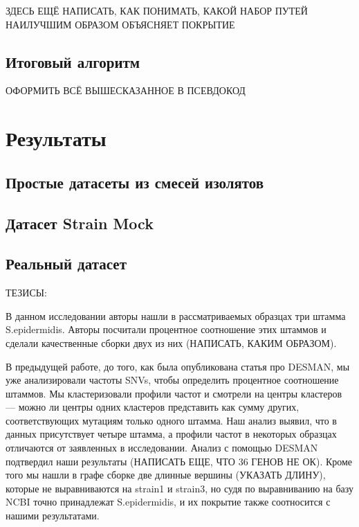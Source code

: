 \documentclass{spbau-diploma}
\begin{document}
ЗДЕСЬ ЕЩЁ НАПИСАТЬ, КАК ПОНИМАТЬ, КАКОЙ НАБОР ПУТЕЙ НАИЛУЧШИМ ОБРАЗОМ ОБЪЯСНЯЕТ ПОКРЫТИЕ

\subsection{Итоговый алгоритм}

ОФОРМИТЬ ВСЁ ВЫШЕСКАЗАННОЕ В ПСЕВДОКОД



\section{Результаты}
\subsection{Простые датасеты из смесей изолятов}
\subsection{Датасет Strain Mock}
\subsection{Реальный датасет} \label{infant_gut_section}

ТЕЗИСЫ:

В данном исследовании авторы нашли в рассматриваемых образцах три штамма S.epidermidis. Авторы посчитали процентное соотношение этих штаммов и сделали качественные сборки двух из них (НАПИСАТЬ, КАКИМ ОБРАЗОМ).

В предыдущей работе, до того, как была опубликована статья про DESMAN, мы уже анализировали частоты SNVs, чтобы определить процентное соотношение штаммов. Мы кластеризовали профили частот и смотрели на центры кластеров --- можно ли центры одних кластеров представить как сумму других, соответствующих мутациям только одного штамма. Наш анализ выявил, что в данных присутствует четыре штамма, а профили частот в некоторых образцах отличаются от заявленных в исследовании. Анализ с помощью DESMAN подтвердил наши результаты (НАПИСАТЬ ЕЩЕ, ЧТО 36 ГЕНОВ НЕ ОК). Кроме того мы нашли в графе сборке две длинные вершины (УКАЗАТЬ ДЛИНУ), которые не выравниваются на strain1 и strain3, но судя по выравниванию на базу NCBI точно принадлежат S.epidermidis, и их покрытие также соотносится с нашими результатами.
\end{document}
